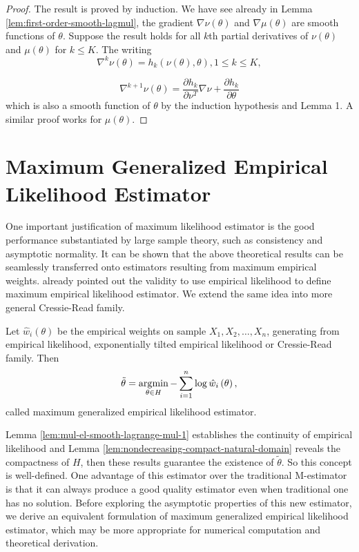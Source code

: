 \begin{proof}
The result is proved by induction. We have see already in Lemma \ref{lem:first-order-smooth-lagmul},
the gradient $\nabla\nu\left(\theta\right)$ and $\nabla\mu\left(\theta\right)$
are smooth functions of $\theta$. Suppose the result holds for all
$k$th partial derivatives of $\nu\left(\theta\right)$ and $\mu\left(\theta\right)$
for $k\le K$. The writing 
\[
\nabla^{k}\nu\left(\theta\right)=h_{k}\left(\nu\left(\theta\right),\theta\right),1\le k\le K,
\]
 
\[
\nabla^{k+1}\nu\left(\theta\right)=\frac{\partial h_{k}}{\partial\nu^{T}}\nabla\nu+\frac{\partial h_{k}}{\partial\theta}
\]
which is also a smooth function of $\theta$ by the induction hypothesis
and Lemma 1. A similar proof works for $\mu\left(\theta\right)$.
\end{proof}

\section{Maximum Generalized Empirical Likelihood Estimator}

One important justification of maximum likelihood estimator is the
good performance substantiated by large sample theory, such as consistency
and asymptotic normality. It can be shown that the above theoretical results
can be seamlessly transferred onto estimators resulting from maximum
empirical weights. \citet{qin1994empirical} already pointed out the
validity to use empirical likelihood to define maximum empirical likelihood
estimator. We extend the same idea into more general Cressie-Read
family. 
\begin{defn}
\label{def:gmele}Let $\hat{w}_{i}\left(\theta\right)$ be the empirical
weights on sample $X_{1},X_{2},\ldots,X_{n}$, generating from empirical
likelihood, exponentially tilted empirical likelihood or Cressie-Read
family. Then 
\[
\tilde{\theta}=\operatorname*{\arg\!\min}_{\theta\in H}-\sum_{i=1}^{n}\log\hat{w}_{i}\left(\theta\right),
\]
called  maximum generalized empirical likelihood estimator.
\end{defn}
Lemma \ref{lem:mul-el-smooth-lagrange-mul-1} establishes the continuity
of empirical likelihood and Lemma \ref{lem:nondecreasing-compact-natural-domain}
reveals the compactness of $H$, then these results guarantee the
existence of $\tilde{\theta}$. So this concept is well-defined. One
advantage of this estimator over the traditional M-estimator is that
it can always produce a good quality estimator even when traditional
one has no solution. Before exploring the asymptotic properties of
this new estimator, we derive an equivalent formulation of  maximum
generalized empirical likelihood estimator, which may be more appropriate
for numerical computation and theoretical derivation. 

